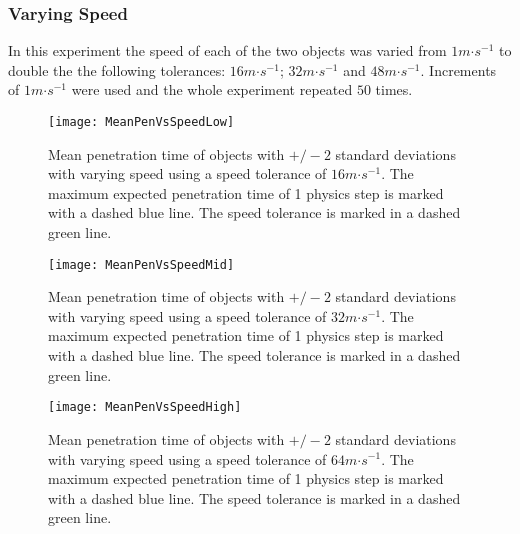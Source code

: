 
\subsubsection{Varying Speed}

In this experiment the speed of each of the two objects was varied from $1m\mathord{\cdot}s^{-1}$ to double the the following tolerances: $16m\mathord{\cdot}s^{-1}$; $32m\mathord{\cdot}s^{-1}$ and $48m\mathord{\cdot}s^{-1}$. Increments of $1m\mathord{\cdot}s^{-1}$ were used and the whole experiment repeated $50$ times.

\begin{figure}[t]
	\centering
	\texttt{[image: MeanPenVsSpeedLow]}
	\caption{Mean penetration time of objects with $+/-2$ standard deviations with varying speed using a speed tolerance of $16m\mathord{\cdot}s^{-1}$. The maximum expected penetration time of 1 physics step is marked with a dashed blue line. The speed tolerance is marked in a dashed green line.}
	\label{fig_CollisionsPenVsSpeedLow}
\end{figure}
\begin{figure}[t]
	\centering
	\texttt{[image: MeanPenVsSpeedMid]}
	\caption{Mean penetration time of objects with $+/-2$ standard deviations with varying speed using a speed tolerance of $32m\mathord{\cdot}s^{-1}$. The maximum expected penetration time of 1 physics step is marked with a dashed blue line. The speed tolerance is marked in a dashed green line.}
	\label{fig_CollisionsPenVsSpeedMid}
\end{figure}
\begin{figure}[t]
	\centering
	\texttt{[image: MeanPenVsSpeedHigh]}
	\caption{Mean penetration time of objects with $+/-2$ standard deviations with varying speed using a speed tolerance of $64m\mathord{\cdot}s^{-1}$. The maximum expected penetration time of 1 physics step is marked with a dashed blue line. The speed tolerance is marked in a dashed green line.}
	\label{fig_CollisionsPenVsSpeedHigh}
\end{figure}
